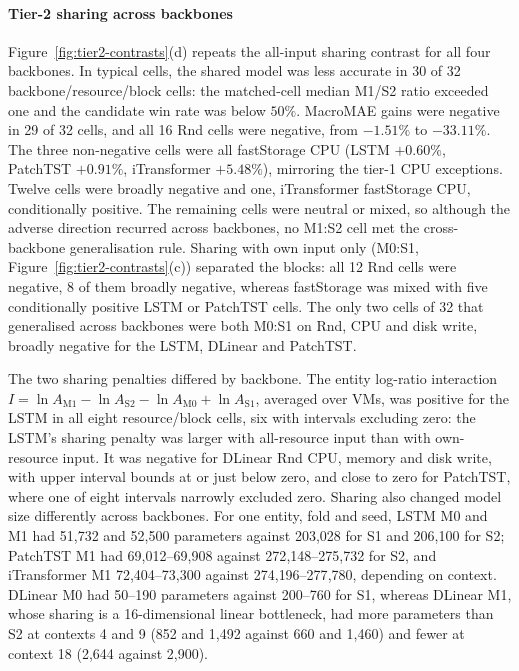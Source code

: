\documentclass[5p,twocolumn]{elsarticle}
\begin{document}
\paragraph{Tier-2 sharing across backbones}
Figure~\ref{fig:tier2-contrasts}(d) repeats the all-input sharing contrast
for all four backbones. In typical cells, the shared model was less accurate
in 30 of 32 backbone/resource/block cells: the matched-cell median M1/S2
ratio exceeded one and the candidate win rate was below $50\%$. MacroMAE
gains were negative in 29 of 32 cells, and all 16 Rnd cells were negative,
from $-1.51\%$ to $-33.11\%$. The three non-negative cells were
all fastStorage CPU (LSTM $+0.60\%$, PatchTST $+0.91\%$, iTransformer
$+5.48\%$), mirroring the tier-1 CPU exceptions. Twelve cells were broadly
negative and one, iTransformer fastStorage CPU, conditionally positive. The
remaining cells were neutral or mixed, so although the adverse direction
recurred across backbones, no M1:S2 cell met the cross-backbone
generalisation rule. Sharing with own input only (M0:S1,
Figure~\ref{fig:tier2-contrasts}(c)) separated the blocks: all 12 Rnd cells
were negative, 8 of them broadly negative, whereas fastStorage was mixed with
five conditionally positive LSTM or PatchTST cells. The only two cells of
32 that generalised across backbones were both M0:S1 on Rnd, CPU and disk
write, broadly negative for the LSTM, DLinear and PatchTST.

The two sharing penalties differed by backbone. The entity log-ratio
interaction $I=\ln A_{\mathrm{M1}}-\ln A_{\mathrm{S2}}-\ln A_{\mathrm{M0}}
+\ln A_{\mathrm{S1}}$, averaged over VMs, was positive for the LSTM in all eight
resource/block cells, six with intervals excluding zero: the LSTM's sharing
penalty was larger with all-resource input than with own-resource input. It
was negative for DLinear Rnd CPU, memory and disk write, with upper interval
bounds at or just below zero, and close to zero for PatchTST, where one of
eight intervals narrowly excluded zero. Sharing also changed model size
differently across backbones. For one entity, fold and seed, LSTM M0 and M1
had 51{,}732 and 52{,}500 parameters against 203{,}028 for S1 and 206{,}100
for S2; PatchTST M1 had 69{,}012--69{,}908 against 272{,}148--275{,}732 for
S2, and iTransformer M1 72{,}404--73{,}300 against 274{,}196--277{,}780,
depending on context. DLinear M0 had 50--190 parameters against 200--760 for
S1, whereas DLinear M1, whose sharing is a 16-dimensional linear bottleneck,
had more parameters than S2 at contexts 4 and 9 (852 and 1{,}492 against 660
and 1{,}460) and fewer at context 18 (2{,}644 against 2{,}900).
\end{document}

